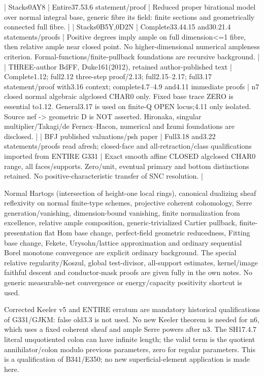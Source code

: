 \documentclass[11pt]{article}
\begin{document}
\begin{OwnProofBody}
| Stacks0AY8 | Entire37.53.6 statement/proof | Reduced proper birational model over normal integral base, generic fibre its field: finite sections and geometrically connected full fibre. |
| Stacks0B5Y,0D2N | Complete33.44.15 and30.21.4 statements/proofs | Positive degrees imply ample on full dimension<=1 fibre, then relative ample near closed point. No higher-dimensional numerical ampleness criterion. Formal-functions/finite-pullback foundations are recursive background. |
| THREE-author BdFF, Duke161(2012), retained author-published text | Complete1.12; full2.12 three-step proof/2.13; full2.15--2.17; full3.17 statement/proof with3.16 context; complete4.7--4.9 and4.11 immediate proofs | n7 closed normal algebraic algclosed CHAR0 only. Fixed base trace ZERO is essential to1.12. General3.17 is used on finite-Q OPEN locus;4.11 only isolated. Source nef -> geometric D is NOT asserted. Hironaka, singular multiplier/Takagi/de Fernex--Hacon, numerical and Izumi foundations are disclosed. |
| BFJ published valuations/psh paper | Full3.18 and3.22 statements/proofs read afresh; closed-face and all-retraction/class qualifications imported from ENTIRE G331 | Exact smooth affine CLOSED algclosed CHAR0 range, all faces/supports. Zero/unit, eventual primary and bottom distinctions retained. No positive-characteristic transfer of SNC resolution. |

Normal Hartogs (intersection of height-one local rings), canonical dualizing sheaf reflexivity on normal finite-type schemes, projective coherent cohomology, Serre generation/vanishing, dimension-bound vanishing, finite normalization from excellence, relative ample composition, generic-trivialized Cartier pullback, finite-presentation flat Hom base change, perfect-field geometric reducedness, Fitting base change, Fekete, Urysohn/lattice approximation and ordinary sequential Borel monotone convergence are explicit ordinary background. The special relative regularity/Koszul, global test-divisor, all-support estimates, kernel/image faithful descent and conductor-mask proofs are given fully in the own notes. No generic measurable-net convergence or energy/capacity positivity shortcut is used.

Corrected Keeler v5 and ENTIRE erratum are mandatory historical qualifications of G331/GJKM: false old3.3 is not used. No new Keeler theorem is needed for n6, which uses a fixed coherent sheaf and ample Serre powers after n3. The SH17.4.7 literal unquotiented colon can have infinite length; the valid term is the quotient annihilator/colon modulo previous parameters, zero for regular parameters. This is a qualification of B341/E350; no new superficial-element application is made here.


\end{OwnProofBody}
\end{document}
